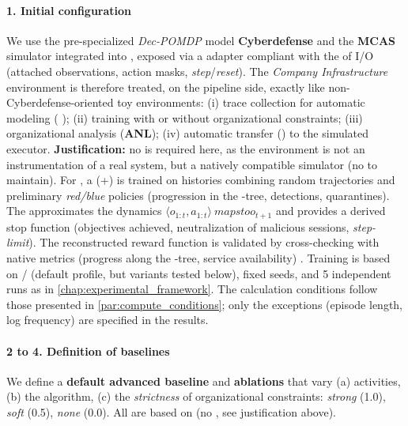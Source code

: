 {\paragraph{1. Initial configuration}

We use the pre-specialized \emph{Dec-POMDP} model \textbf{Cyberdefense} and the \textbf{MCAS} simulator integrated into , exposed via a  adapter compliant with the  of I/O  (attached observations, action masks, \emph{step}/\emph{reset}). The \emph{Company Infrastructure} environment is therefore treated, on the pipeline side, exactly like non-Cyberdefense-oriented toy environments: (i) trace collection for automatic modeling ( ); (ii)  training with or without organizational constraints; (iii) organizational analysis (\textbf{ANL}); (iv) automatic transfer () to the simulated executor.
\textbf{Justification:} no  is required here, as the environment is not an instrumentation of a real system, but a natively compatible simulator (no  to maintain).
For , a  (+) is trained on histories combining random trajectories and preliminary \emph{red/blue} policies (progression in the -tree, detections, quarantines). The  approximates the dynamics $\langle o_{1:t},a_{1:t} \rangle \ mapsto o_{t+1}$ and provides a derived stop function (objectives achieved, neutralization of malicious sessions, \emph{step-limit}). The reconstructed reward function is validated by cross-checking with native metrics (progress along the -tree, service availability) . Training is based on / (default  profile, but variants tested below), fixed seeds, and 5 independent runs as in \autoref{chap:experimental_framework}. The calculation conditions follow those presented in \autoref{par:compute_conditions}; only the exceptions (episode length, log frequency) are specified in the results.

\paragraph{2 to 4. Definition of baselines}

We define a \textbf{default advanced baseline} and \textbf{ablations} that vary (a)  activities, (b) the  algorithm, (c) the \emph{strictness} of organizational constraints: \emph{strong} (1.0), \emph{soft} (0.5), \emph{none} (0.0). All are based on  (no , see justification above).

}
